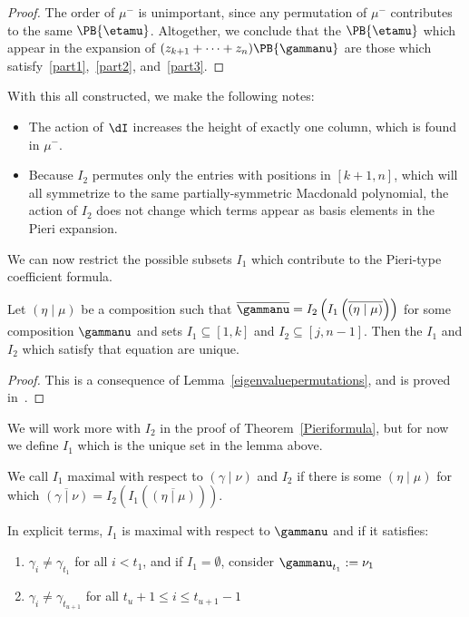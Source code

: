 \begin{proof}
The order of $\mu^-$ is unimportant, since any permutation of $\mu^-$ contributes to the same $\PB{\etamu}$. Altogether, we conclude that the $\PB{\etamu}$ which appear in the expansion of $(z_{k+1} + \dotsm + z_{n})\PB{\gammanu}$ are those which satisfy~\eqref{part1},~\eqref{part2}, and~\eqref{part3}. \qedhere \end{proof}



 With this all constructed, we make the following notes:
\begin{itemize}
    \item The action of $\dI$ increases the height of exactly one column, which is found in $\mu^-$.
    \item Because $I_2$ permutes only the entries with positions in $[k+1,n]$, which will all symmetrize to the same partially-symmetric Macdonald polynomial, the action of $I_2$ does not change which terms appear as basis elements in the Pieri expansion.
\end{itemize}

We can now restrict the possible subsets $I_1$ which contribute to the Pieri-type coefficient formula.

\begin{lemm}\label{comaximality}Let $(\eta \mid \mu)$ be a composition such that $\overline{\gammanu} = I_2\left( I_1 \left(\overline{(\eta \mid \mu)} \right)\right)$ for some composition $\gammanu$ and sets $I_1\subseteq [1,k]$ and $I_2 \subseteq [j,n-1]$. Then the $I_1$ and $I_2$ which satisfy that equation are unique.
\end{lemm}
\begin{proof}
This is a consequence of Lemma~\ref{eigenvaluepermutations}, and is proved in~\cite[proof of Lemma~4.3] {MR1456318}.
\end{proof}

We will work more with $I_2$ in the proof of Theorem~\ref{Pieriformula}, but for now we define $I_1$ which is the unique set in the lemma above.


\begin{defi}\label{maximality}
We call $I_1$ maximal with respect to $(\gamma \mid \nu)$ and $I_2$ if there is some $(\eta \mid \mu)$ for which $\overline{(\gamma \mid \nu)} = I_2 \left( I_1 \left( \overline{(\eta \mid \mu)} \right)\right)$.
\end{defi}
In explicit terms, $I_1$ is maximal with respect to $\gammanu$ and if it satisfies:
\begin{enumerate}
    \item $\gamma_i \neq \gamma_{t_1}$ for all $i< t_1$, and if $I_1=\emptyset$, consider $\gammanu_{t_1} := \nu_1$ \item $\gamma_i \neq \gamma_{t_{u+1}}$ for all $t_u+1 \leq i \leq t_{u+1}-1$
\end{enumerate}


